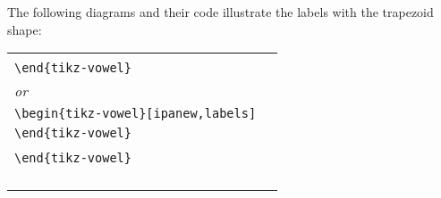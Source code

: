 \documentclass{article}
\begin{document}
\noindent
The following diagrams and their code illustrate the labels with the trapezoid shape:

\begin{center}
\begin{tabular}{ll}
  \begin{minipage}[t]{6.5cm}{\small
    \verb|\begin{tikz-vowel}[labels]|\\
    \verb|\end{tikz-vowel}|\\
    \emph{or}\\
    \verb|\begin{tikz-vowel}[ipanew,labels]|\\
    \verb|\end{tikz-vowel}|\\}
  \end{minipage} &
  \begin{minipage}[t]{6.5cm}{\small
    \verb|\begin{tikz-vowel}[plain,labels]|\\
    \verb|\end{tikz-vowel}|\\}
  \end{minipage} \\
  \begin{minipage}[t]{6.5cm}{
  \hspace*{-1.75cm}
  \begin{tikz-vowel}\end{tikz-vowel} \\}\end{minipage} &
  \begin{minipage}[t]{6.5cm}{
  \hspace*{-1.5cm}
  \begin{tikz-vowel}\end{tikz-vowel} \\}\end{minipage}
\end{tabular}

\bigskip


\end{center}
\end{document}
